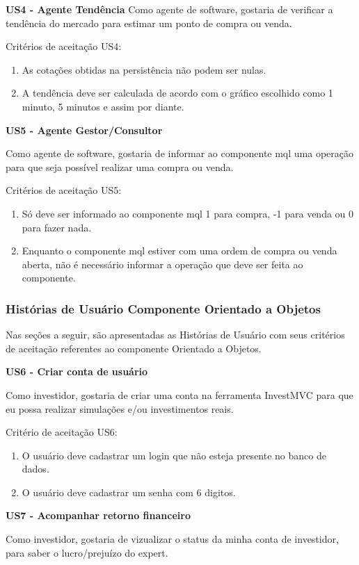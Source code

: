 \textbf{US4 - Agente Tendência}
Como agente de software, gostaria de verificar a tendência do mercado para estimar um ponto de compra ou venda.

Critérios de aceitação US4:
\begin{enumerate}
\item As cotações obtidas na persistência não podem ser nulas.
\item A tendência deve ser calculada de acordo com o gráfico escolhido como 1 minuto, 5 minutos e assim por diante.
\end{enumerate}

\textbf{US5 - Agente Gestor/Consultor}

Como agente de software, gostaria de informar ao componente mql uma operação para que seja possível realizar uma compra ou venda.

Critérios de aceitação US5:
\begin{enumerate}
\item Só deve ser informado ao componente mql 1 para compra, -1 para venda ou 0 para fazer nada.
\item Enquanto o componente mql estiver com uma ordem de compra ou venda aberta, não é necessário informar a operação que deve ser feita ao componente.
\end{enumerate}

\subsubsection{Histórias de Usuário Componente Orientado a Objetos}

Nas seções a seguir, são apresentadas as Histórias de Usuário com seus critérios de aceitação referentes ao componente Orientado a Objetos.

\textbf{US6 - Criar conta de usuário}

Como investidor, gostaria de criar uma conta na ferramenta InvestMVC para que eu possa realizar simulações e/ou investimentos reais.

Critério de aceitação US6:
\begin{enumerate}
\item O usuário deve cadastrar um login que não esteja presente no banco de dados.
\item O usuário deve cadastrar um senha com 6 digitos.
\end{enumerate}

\textbf{US7 - Acompanhar retorno financeiro}

Como investidor, gostaria de vizualizar o status da minha conta de investidor, para saber o lucro/prejuízo do expert.

